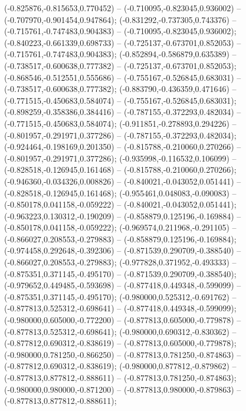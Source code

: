  (-0.825876,-0.815653,0.770452) -- (-0.710095,-0.823045,0.936002) -- (-0.707970,-0.901454,0.947864);
 (-0.831292,-0.737305,0.743376) -- (-0.715761,-0.747483,0.904383) -- (-0.710095,-0.823045,0.936002);
 (-0.840223,-0.661339,0.698733) -- (-0.725137,-0.673701,0.852053) -- (-0.715761,-0.747483,0.904383);
 (-0.852894,-0.586879,0.635389) -- (-0.738517,-0.600638,0.777382) -- (-0.725137,-0.673701,0.852053);
 (-0.868546,-0.512551,0.555686) -- (-0.755167,-0.526845,0.683031) -- (-0.738517,-0.600638,0.777382);
 (-0.883790,-0.436359,0.471646) -- (-0.771515,-0.450683,0.584074) -- (-0.755167,-0.526845,0.683031);
 (-0.898259,-0.358386,0.384416) -- (-0.787155,-0.372293,0.482034) -- (-0.771515,-0.450683,0.584074);
 (-0.911851,-0.278893,0.294226) -- (-0.801957,-0.291971,0.377286) -- (-0.787155,-0.372293,0.482034);
 (-0.924464,-0.198169,0.201350) -- (-0.815788,-0.210060,0.270266) -- (-0.801957,-0.291971,0.377286);
 (-0.935998,-0.116532,0.106099) -- (-0.828518,-0.126945,0.161468) -- (-0.815788,-0.210060,0.270266);
 (-0.946360,-0.034326,0.008826) -- (-0.840021,-0.043052,0.051441) -- (-0.828518,-0.126945,0.161468);
 (-0.955461,0.048083,-0.090083) -- (-0.850178,0.041158,-0.059222) -- (-0.840021,-0.043052,0.051441);
 (-0.963223,0.130312,-0.190209) -- (-0.858879,0.125196,-0.169884) -- (-0.850178,0.041158,-0.059222);
 (-0.969574,0.211968,-0.291105) -- (-0.866027,0.208553,-0.279883) -- (-0.858879,0.125196,-0.169884);
 (-0.974458,0.292648,-0.392306) -- (-0.871539,0.290709,-0.388540) -- (-0.866027,0.208553,-0.279883);
 (-0.977828,0.371952,-0.493333) -- (-0.875351,0.371145,-0.495170) -- (-0.871539,0.290709,-0.388540);
 (-0.979652,0.449485,-0.593698) -- (-0.877418,0.449348,-0.599099) -- (-0.875351,0.371145,-0.495170);
 (-0.980000,0.525312,-0.691762) -- (-0.877813,0.525312,-0.698641) -- (-0.877418,0.449348,-0.599099);
 (-0.980000,0.605000,-0.772200) -- (-0.877813,0.605000,-0.779878) -- (-0.877813,0.525312,-0.698641);
 (-0.980000,0.690312,-0.830362) -- (-0.877812,0.690312,-0.838619) -- (-0.877813,0.605000,-0.779878);
 (-0.980000,0.781250,-0.866250) -- (-0.877813,0.781250,-0.874863) -- (-0.877812,0.690312,-0.838619);
 (-0.980000,0.877812,-0.879862) -- (-0.877813,0.877812,-0.888611) -- (-0.877813,0.781250,-0.874863);
 (-0.980000,0.980000,-0.871200) -- (-0.877813,0.980000,-0.879863) -- (-0.877813,0.877812,-0.888611);
